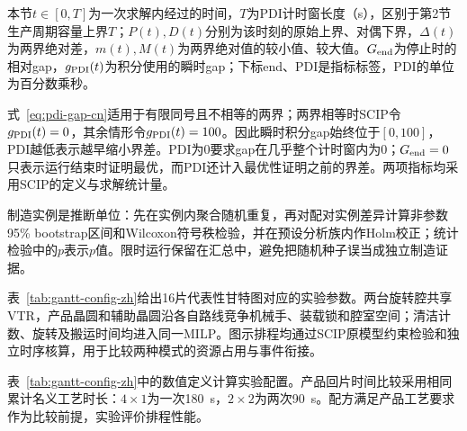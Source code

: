 \documentclass[final,5p,times,twocolumn]{elsarticle}
\begin{document}
本节$t\in[0,T]$为一次求解内经过的时间，$T$为PDI计时窗长度（s），区别于第2节生产周期容量上界$T$；$P(t),D(t)$分别为该时刻的原始上界、对偶下界，$\Delta(t)$为两界绝对差，$m(t),M(t)$为两界绝对值的较小值、较大值。$G_{\rm end}$为停止时的相对gap，$g_{\rm PDI}(t)$为积分使用的瞬时gap；下标end、PDI是指标标签，PDI的单位为百分数乘秒。


式~\eqref{eq:pdi-gap-cn}适用于有限同号且不相等的两界；两界相等时SCIP令$g_{\rm PDI}(t)=0$，其余情形令$g_{\rm PDI}(t)=100$。因此瞬时积分gap始终位于$[0,100]$，PDI越低表示越早缩小界差。PDI为0要求gap在几乎整个计时窗内为0；$G_{\rm end}=0$只表示运行结束时证明最优，而PDI还计入最优性证明之前的界差。两项指标均采用SCIP的定义与求解统计量\citep{achterberg2009scip,bestuzheva2023scip}。

制造实例是推断单位：先在实例内聚合随机重复，再对配对实例差异计算非参数95\% bootstrap区间和Wilcoxon符号秩检验，并在预设分析族内作Holm校正；统计检验中的$p$表示$p$值。限时运行保留在汇总中，避免把随机种子误当成独立制造证据。

表~\ref{tab:gantt-config-zh}给出16片代表性甘特图对应的实验参数。两台旋转腔共享VTR，产品晶圆和辅助晶圆沿各自路线竞争机械手、装载锁和腔室空间；清洁计数、旋转及搬运时间均进入同一MILP。图示排程均通过SCIP原模型约束检验和独立时序核算，用于比较两种模式的资源占用与事件衔接。

表~\ref{tab:gantt-config-zh}中的数值定义计算实验配置。产品回片时间比较采用相同累计名义工艺时长：$4\times1$为一次180~s，$2\times2$为两次90~s。配方满足产品工艺要求作为比较前提，实验评价排程性能。
\end{document}
